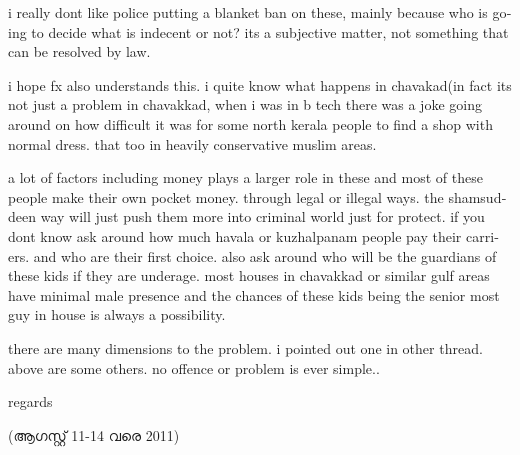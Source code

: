 \begin{english}
i really dont like police putting a blanket ban on these, mainly
because who is going to decide what is indecent or not? its a
subjective matter, not something that can be resolved by law.

i hope fx also understands this. i quite know what happens in
chavakad(in fact its not just a problem in chavakkad, when i was in b
tech there was a joke going around on how difficult it was for some
north kerala people to find a shop with normal dress. that too in
heavily conservative muslim areas.

a lot of factors including money plays a larger role in these and most
of these people make their own pocket money. through legal or illegal
ways. the shamsuddeen way will just push them more into criminal world
just for protect. if you dont know ask around how much havala or
kuzhalpanam people pay their carriers. and who are their first choice.
also ask around who will be the guardians of these kids if they are
underage. most houses in chavakkad or similar gulf areas have minimal
male presence and the chances of these kids being the senior most guy
in house is always a possibility.

there are many dimensions to the problem. i pointed out one in other
thread. above are some others. no offence or problem is ever simple..

regards

\begin{flushright}(ആഗസ്റ്റ് 11-14 വരെ 2011)\end{flushright} 
\end{english}

